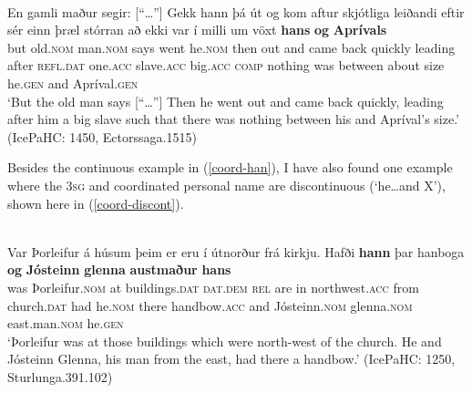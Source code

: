 \documentclass[output=paper,colorlinks,citecolor=brown]{langscibook}
\begin{document}
\ea \label{coord-han}
 \\ 
\gll En gamli maður segir: [``\dots''] Gekk hann þá út og kom aftur skjótliga leiðandi eftir sér einn þræl stórran að ekki var {í milli} um vöxt \textbf{hans} \textbf{og} \textbf{Aprívals}\\
but old.\textsc{nom} man.\textsc{nom} says {} went he.\textsc{nom} then out and came back quickly leading after \textsc{refl.dat} one.\textsc{acc} slave.\textsc{acc} big.\textsc{acc} \textsc{comp} nothing was between about size he.\textsc{gen} and Apríval.\textsc{gen}\\
\glt `But the old man says [``\dots''] Then he went out and came back quickly, leading after him a big slave such that there was nothing between his and Apríval's size.' (IcePaHC: 1450, Ectorssaga.1515)
\z 


Besides the continuous example in (\ref{coord-han}), I have also found one example where the 3\textsc{sg}  and coordinated personal name are discontinuous (`he\dots and X'), shown here in (\ref{coord-discont}).

\ea \label{coord-discont}\\
\gll Var Þorleifur á húsum þeim er eru í útnorður frá kirkju. Hafði \textbf{hann} þar hanboga \textbf{og} \textbf{Jósteinn} \textbf{glenna} \textbf{austmaður} \textbf{hans}\\
was Þorleifur.\textsc{nom} at buildings.\textsc{dat} \textsc{dat.dem} \textsc{rel} are in northwest.\textsc{acc} from church.\textsc{dat} had he.\textsc{nom} there handbow.\textsc{acc} and Jósteinn.\textsc{nom} glenna.\textsc{nom} east.man.\textsc{nom} he.\textsc{gen}\\
\glt `Þorleifur was at those buildings which were north-west of the church. He and Jósteinn Glenna, his man from the east, had there a handbow.' (IcePaHC: 1250, Sturlunga.391.102) %
\z
\end{document}
